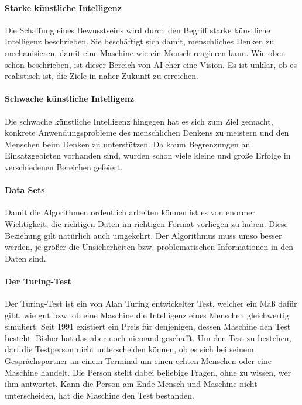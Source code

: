 \paragraph{Starke künstliche Intelligenz} Die Schaffung eines Bewusstseins wird durch den Begriff starke künstliche Intelligenz beschrieben. Sie beschäftigt sich damit, menschliches Denken zu mechanisieren, damit eine Maschine wie ein Mensch reagieren kann. Wie oben schon beschrieben, ist dieser Bereich von AI eher eine Vision. Es ist unklar, ob es realistisch ist, die Ziele in naher Zukunft zu erreichen.

\paragraph{Schwache künstliche Intelligenz}
Die schwache künstliche Intelligenz hingegen hat es sich zum Ziel gemacht, konkrete Anwendungsprobleme des menschlichen Denkens zu meistern und den Menschen \glqq beim Denken\grqq{} zu unterstützen. Da kaum Begrenzungen an Einsatzgebieten vorhanden sind, wurden schon viele kleine und große Erfolge in verschiedenen Bereichen gefeiert.

\paragraph{Data Sets}
Damit die Algorithmen ordentlich arbeiten können ist es von enormer Wichtigkeit, die richtigen Daten im richtigen Format vorliegen zu haben. Diese Beziehung gilt natürlich auch umgekehrt. Der Algorithmus muss umso besser werden, je größer die Unsicherheiten bzw. problematischen Informationen in den Daten sind. ~\cite{F_KI_3.3.1}

\paragraph{Der Turing-Test}
Der Turing-Test ist ein von Alan Turing entwickelter Test, welcher ein Maß dafür gibt, wie gut bzw. ob eine Maschine die Intelligenz eines Menschen gleichwertig simuliert. Seit 1991 existiert ein Preis für denjenigen, dessen Maschine den Test besteht. Bisher hat das aber noch niemand geschafft. Um den Test zu bestehen, darf die Testperson nicht unterscheiden können, ob es sich bei seinem Gesprächspartner an einem Terminal um einen echten Menschen oder eine Maschine handelt. Die Person stellt dabei beliebige Fragen, ohne zu wissen, wer ihm antwortet. Kann die Person am Ende Mensch und Maschine nicht unterscheiden, hat die Maschine den Test bestanden. ~\cite{F_TuringTest_3.3.1}


